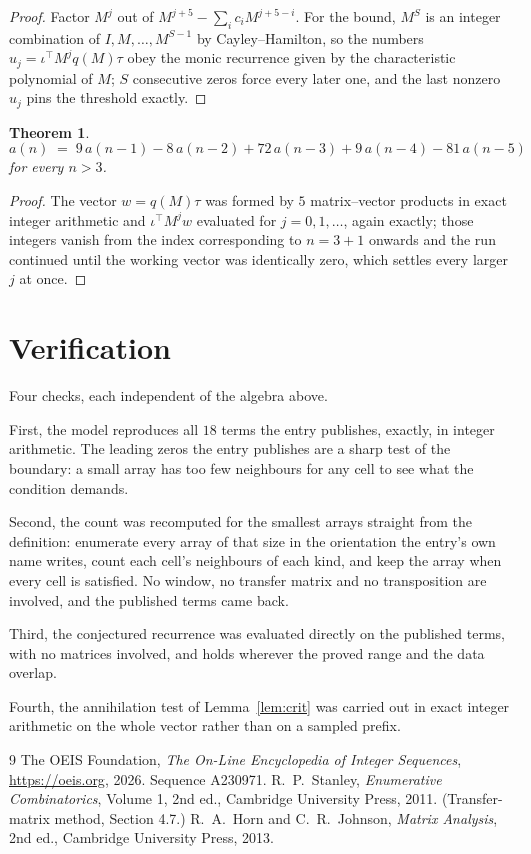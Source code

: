\documentclass[11pt,a4paper]{article}
\theoremstyle{plain}
\newtheorem{theorem}{Theorem}
\theoremstyle{definition}
\begin{document}
\begin{proof}
Factor $M^{j}$ out of $M^{j+5}-\sum_ic_iM^{j+5-i}$. For the bound, $M^{S}$
is an integer combination of $I,M,\dots,M^{S-1}$ by Cayley--Hamilton, so the numbers
$u_j=\iota^{\!\top}M^{j}q(M)\tau$ obey the monic recurrence given by the characteristic
polynomial of $M$; $S$ consecutive zeros force every later one, and the last nonzero $u_j$
pins the threshold exactly.
\end{proof}

\begin{theorem}
\[
a(n)\;=\;9\,a(n-1) - 8\,a(n-2) + 72\,a(n-3) + 9\,a(n-4) - 81\,a(n-5)
\]
for every $n>3$.
\end{theorem}

\begin{proof}
The vector $w=q(M)\tau$ was formed by $5$ matrix--vector products in exact integer
arithmetic and $\iota^{\!\top}M^{j}w$ evaluated for $j=0,1,\dots$, again exactly; those
integers vanish from the index corresponding to $n=3+1$ onwards and the run continued
until the working vector was identically zero, which settles every larger $j$ at once.
\end{proof}

\section{Verification}

Four checks, each independent of the algebra above.

First, the model reproduces all $18$ terms the entry publishes, exactly, in integer
arithmetic. The leading zeros the entry publishes are a sharp test of the boundary: a small
array has too few neighbours for any cell to see what the condition demands.

Second, the count was recomputed for the smallest arrays straight from the definition:
enumerate every array of that size in the orientation the entry's own name writes, count each
cell's neighbours of each kind, and keep the array when every cell is satisfied. No window, no
transfer matrix and no transposition are involved, and the published terms came back.

Third, the conjectured recurrence was evaluated directly on the published terms, with no
matrices involved, and holds wherever the proved range and the data overlap.

Fourth, the annihilation test of Lemma~\ref{lem:crit} was carried out in exact integer
arithmetic on the whole vector rather than on a sampled prefix.

\begin{thebibliography}{9}
 The OEIS Foundation, \emph{The On-Line Encyclopedia of Integer
Sequences}, \url{https://oeis.org}, 2026. Sequence A230971.
 R.~P.~Stanley, \emph{Enumerative Combinatorics}, Volume 1, 2nd ed.,
Cambridge University Press, 2011. (Transfer-matrix method, Section 4.7.)
 R.~A.~Horn and C.~R.~Johnson, \emph{Matrix Analysis}, 2nd ed., Cambridge
University Press, 2013.
\end{thebibliography}
\end{document}
